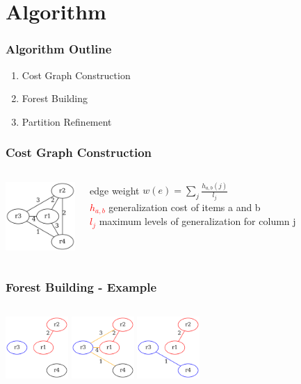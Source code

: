 \section{Algorithm}

\begin{frame}
  \frametitle{Algorithm Outline}
  \begin{enumerate}
    \item Cost Graph Construction
    \item Forest Building
    \item Partition Refinement
  \end{enumerate}
\end{frame}

\begin{frame}
  \frametitle{Cost Graph Construction}
  \begin{columns}
    \centering
    \includegraphics[width=100px]{../graphs/cost-graph.png}
    \begin{block}{edge weight}
      \(w(e)=\sum_{j}^{} \frac{h_{a,b}(j)}{l_{j}}\) \\
      \scriptsize{
	\textcolor{red}{ \(h_{a,b}\) } generalization cost of items a and b \\
	\textcolor{red}{ \(l_{j}\) } maximum levels of generalization for column j
      }
    \end{block}
  \end{columns}
\end{frame}

\begin{frame}
  \frametitle{Forest Building - Example}
  \begin{columns}
    \includegraphics[width=90px]{../graphs/cost-graph-s3.png}
    \includegraphics[width=90px]{../graphs/cost-graph-s4.png}
    \includegraphics[width=90px]{../graphs/cost-graph-s5.png}
  \end{columns}
\end{frame}


